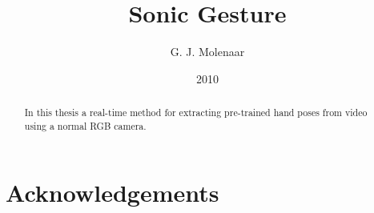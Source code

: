 \documentclass[a4paper]{report}
\begin{document}
\title{Sonic Gesture}
\author{G. J. Molenaar}
\date{2010}

\maketitle

\tableofcontents
\listoffigures
\listoftables

\chapter*{Acknowledgements}

\begin{abstract}
In this thesis a real-time method for extracting pre-trained hand poses from
video using a normal RGB camera. 
\end{abstract}














\end{document}
